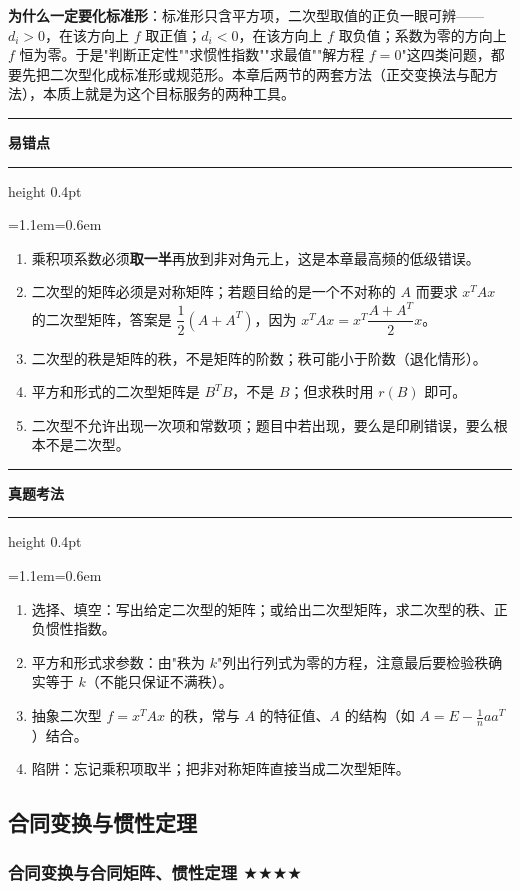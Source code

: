 \documentclass[11pt,openany,UTF8]{ctexbook}
\newcommand{\callouthead}[2]{%
  \par\addvspace{7pt}\noindent
  {\color{#1}\rule[-0.15em]{3pt}{1.05em}}\hspace{0.5em}%
  {\bfseries\color{#1}#2}\par\nobreak\vspace{-0.35em}%
  {\color{rulesep}\hrule height 0.4pt}\nobreak\vspace{0.45em}%
  \begingroup\small\setlength{\parindent}{0pt}%
  \leftskip=1.1em\rightskip=0.6em\noindent\ignorespaces}
\newcommand{\calloutend}{\par\endgroup\addvspace{7pt}}
\newenvironment{callwarn}[1]{\callouthead{warnbar}{#1}}{\calloutend}
\newenvironment{callexam}[1]{\callouthead{exambar}{#1}}{\calloutend}
\begin{document}
\textbf{为什么一定要化标准形}：标准形只含平方项，二次型取值的正负一眼可辨——$d_i>0$，在该方向上 $f$ 取正值；$d_i<0$，在该方向上 $f$ 取负值；系数为零的方向上 $f$ 恒为零。于是"判断正定性""求惯性指数""求最值""解方程 $f=0$"这四类问题，都要先把二次型化成标准形或规范形。本章后两节的两套方法（正交变换法与配方法），本质上就是为这个目标服务的两种工具。

\begin{callwarn}{易错点}
\begin{enumerate}
\item 乘积项系数必须\textbf{取一半}再放到非对角元上，这是本章最高频的低级错误。
\item 二次型的矩阵必须是对称矩阵；若题目给的是一个不对称的 $A$ 而要求 $x^TAx$ 的二次型矩阵，答案是 $\dfrac12(A+A^T)$，因为 $x^TAx=x^T\dfrac{A+A^T}{2}x$。
\item 二次型的秩是矩阵的秩，不是矩阵的阶数；秩可能小于阶数（退化情形）。
\item 平方和形式的二次型矩阵是 $B^TB$，不是 $B$；但求秩时用 $r(B)$ 即可。
\item 二次型不允许出现一次项和常数项；题目中若出现，要么是印刷错误，要么根本不是二次型。
\end{enumerate}
\end{callwarn}

\begin{callexam}{真题考法}
\begin{enumerate}
\item 选择、填空：写出给定二次型的矩阵；或给出二次型矩阵，求二次型的秩、正负惯性指数。
\item 平方和形式求参数：由"秩为 $k$"列出行列式为零的方程，注意最后要检验秩确实等于 $k$（不能只保证不满秩）。
\item 抽象二次型 $f=x^TAx$ 的秩，常与 $A$ 的特征值、$A$ 的结构（如 $A=E-\frac1naa^T$）结合。
\item 陷阱：忘记乘积项取半；把非对称矩阵直接当成二次型矩阵。
\end{enumerate}
\end{callexam}

\subsection{合同变换与惯性定理}

\subsubsection{合同变换与合同矩阵、惯性定理 $\bigstar$$\bigstar$$\bigstar$$\bigstar$}
\end{document}

